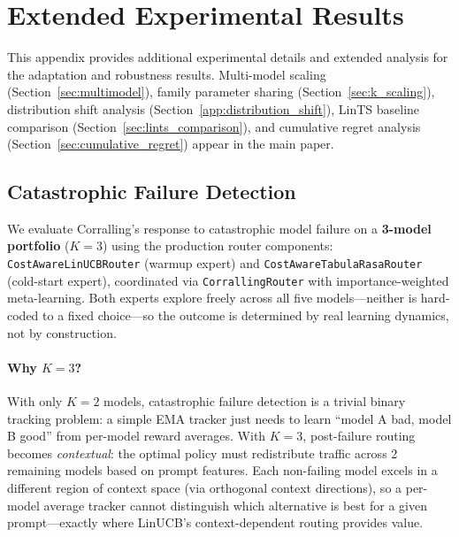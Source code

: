 
\section{Extended Experimental Results}
\label{app:adaptation_details}

This appendix provides additional experimental details and extended analysis for the adaptation and robustness results.  Multi-model scaling (Section~\ref{sec:multimodel}), family parameter sharing (Section~\ref{sec:k_scaling}), distribution shift analysis (Section~\ref{app:distribution_shift}), LinTS baseline comparison (Section~\ref{sec:lints_comparison}), and cumulative regret analysis (Section~\ref{sec:cumulative_regret}) appear in the main paper.




\subsection{Catastrophic Failure Detection}
\label{app:catastrophic_failure}

We evaluate Corralling's response to catastrophic model failure on a \textbf{3-model portfolio} ($K{=}3$) using the production router components: \texttt{CostAwareLinUCBRouter} (warmup expert) and \texttt{CostAwareTabulaRasaRouter} (cold-start expert), coordinated via \texttt{CorrallingRouter} with importance-weighted meta-learning. Both experts explore freely across all five models---neither is hard-coded to a fixed choice---so the outcome is determined by real learning dynamics, not by construction.

\paragraph{Why $K{=}3$?} With only $K{=}2$ models, catastrophic failure detection is a trivial binary tracking problem: a simple EMA tracker just needs to learn ``model A bad, model B good'' from per-model reward averages. With $K{=}3$, post-failure routing becomes \emph{contextual}: the optimal policy must redistribute traffic across 2 remaining models based on prompt features. Each non-failing model excels in a different region of context space (via orthogonal context directions), so a per-model average tracker cannot distinguish which alternative is best for a given prompt---exactly where LinUCB's context-dependent routing provides value.

